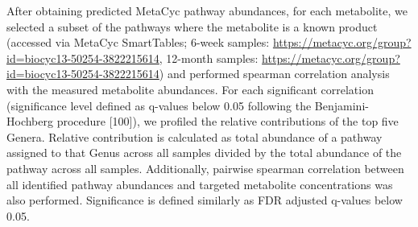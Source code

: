 After obtaining predicted MetaCyc pathway abundances, for each metabolite, we selected a subset of the pathways where the metabolite is a known product (accessed via MetaCyc SmartTables; 6-week samples: \url{https://metacyc.org/group?id=biocyc13-50254-3822215614}, 12-month samples: \url{https://metacyc.org/group?id=biocyc13-50254-3822215614}) and performed spearman correlation analysis with the measured metabolite abundances. For each significant correlation (significance level defined as q-values below 0.05 following the Benjamini-Hochberg procedure [100]), we profiled the relative contributions of the top five Genera. Relative contribution is calculated as total abundance of a pathway assigned to that Genus across all samples divided by the total abundance of the pathway across all samples. 
Additionally, pairwise spearman correlation between all identified pathway abundances and targeted metabolite concentrations was also performed. Significance is defined similarly as FDR adjusted q-values below 0.05.    
